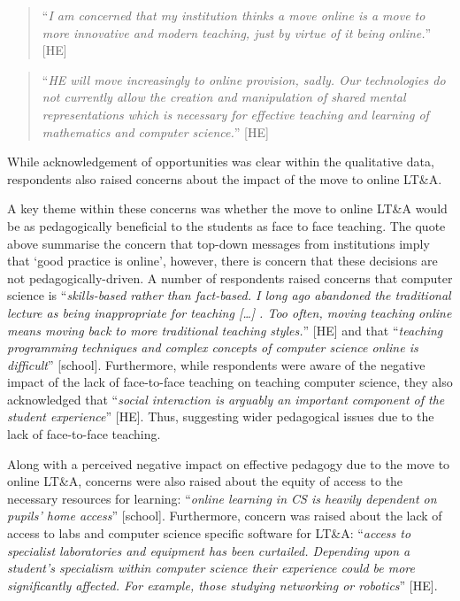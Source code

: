 \documentclass[sigconf]{acmart}
\begin{document}
\begin{quotation}
``{\emph{I am concerned that my institution thinks a move online is a
move to more innovative and modern teaching, just by virtue of it
being online.}}'' [HE]
\end{quotation}

\begin{quotation}
``{\emph{HE will move increasingly to online provision, sadly. Our technologies
do not currently allow the creation and manipulation of shared mental
representations which is necessary for effective teaching and learning
of mathematics and computer science.}}'' [HE]
\end{quotation}

While acknowledgement of opportunities was clear within the
qualitative data, respondents also raised concerns about the impact of
the move to online LT\&A.

A key theme within these concerns was whether the move to online LT\&A
would be as pedagogically beneficial to the students as face to face
teaching. The quote above summarise the concern that top-down messages
from institutions imply that `good practice is online', however, there
is concern that these decisions are not pedagogically-driven. A number
of respondents raised concerns that computer science is
``{\emph{skills-based rather than fact-based.  I long ago abandoned
the traditional lecture as being inappropriate for teaching […] .  Too
often, moving teaching online means moving back to more traditional
teaching styles.}}” [HE] and that ``{\emph{teaching programming
techniques and complex concepts of computer science online is
difficult}}'' [school]. Furthermore, while respondents were aware of
the negative impact of the lack of face-to-face teaching on teaching
computer science, they also acknowledged that ``{\emph{social
interaction is arguably an important component of the student
experience}}'' [HE]. Thus, suggesting wider pedagogical issues due to
the lack of face-to-face teaching.

Along with a perceived negative impact on effective pedagogy due to
the move to online LT\&A, concerns were also raised about the equity
of access to the necessary resources for learning: ``{\emph{online learning in
CS is heavily dependent on pupils' home access}}'' [school]. Furthermore,
concern was raised about the lack of access to labs and computer
science specific software for LT\&A: ``{\emph{access to specialist
laboratories and equipment has been curtailed. Depending upon a
student’s specialism within computer science their experience could be
more significantly affected. For example, those studying networking or
robotics}}'' [HE].
\end{document}
